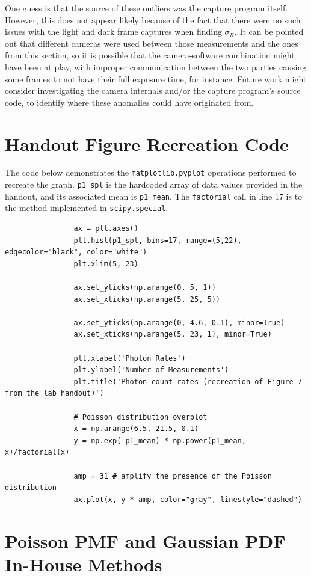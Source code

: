\documentclass[preprint2]{aastex702}
\begin{document}
			One guess is that the source of these outliers was the capture program itself. However, this does not appear likely because of the fact that there were no such issues with the light and dark frame captures when finding $\sigma_R$. It can be pointed out that different cameras were used between those measurements and the ones from this section, so it is possible that the camera-software combination might have been at play, with improper communication between the two parties causing some frames to not have their full exposure time, for instance. Future work might consider investigating the camera internals and/or the capture program's source code, to identify where these anomalies could have originated from.

	\newpage
    \appendix

		\section{Handout Figure Recreation Code}\label{4.1-fig7-code}

			The code below demonstrates the \texttt{matplotlib.pyplot} operations performed to recreate the graph. \texttt{p1\_spl} is the hardcoded array of data values provided in the handout, and its associated mean is \texttt{p1\_mean}. The \texttt{factorial} call in line 17 is to the method implemented in \texttt{scipy.special}.

			\begin{verbatim}
				ax = plt.axes()
				plt.hist(p1_spl, bins=17, range=(5,22), edgecolor="black", color="white")
				plt.xlim(5, 23)

				ax.set_yticks(np.arange(0, 5, 1))
				ax.set_xticks(np.arange(5, 25, 5))

				ax.set_yticks(np.arange(0, 4.6, 0.1), minor=True)
				ax.set_xticks(np.arange(5, 23, 1), minor=True)

				plt.xlabel('Photon Rates')
				plt.ylabel('Number of Measurements')
				plt.title('Photon count rates (recreation of Figure 7 from the lab handout)')
				
				# Poisson distribution overplot
				x = np.arange(6.5, 21.5, 0.1)
				y = np.exp(-p1_mean) * np.power(p1_mean, x)/factorial(x)
				
				amp = 31 # amplify the presence of the Poisson distribution
				ax.plot(x, y * amp, color="gray", linestyle="dashed")
			\end{verbatim}

		\section{Poisson PMF and Gaussian PDF In-House Methods}\label{4.1-sl-code}
\end{document}
